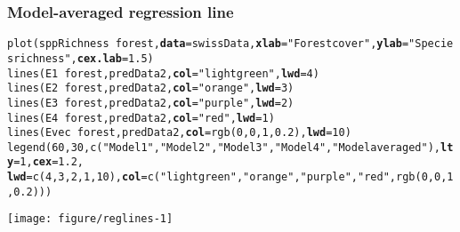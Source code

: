 \documentclass[color=usenames,dvipsnames]{beamer}\usepackage[]{graphicx}\usepackage[]{color}
\makeatletter
\newcommand{\hlnum}[1]{\textcolor[rgb]{0.69,0.494,0}{#1}}%
\newcommand{\hlstr}[1]{\textcolor[rgb]{0.749,0.012,0.012}{#1}}%
\newcommand{\hlopt}[1]{\textcolor[rgb]{0,0,0}{#1}}%
\newcommand{\hlstd}[1]{\textcolor[rgb]{0,0,0}{#1}}%
\newcommand{\hlkwc}[1]{\textcolor[rgb]{0,0,0}{\textbf{#1}}}%
\newcommand{\hlkwd}[1]{\textcolor[rgb]{0.004,0.004,0.506}{#1}}%
\newenvironment{kframe}{%
 \def\at@end@of@kframe{}%
 \ifinner\ifhmode%
  \def\at@end@of@kframe{\end{minipage}}%
  \begin{minipage}{\columnwidth}%
 \fi\fi%
 \def\FrameCommand##1{\hskip\@totalleftmargin \hskip-\fboxsep
 \colorbox{shadecolor}{##1}\hskip-\fboxsep
     \hskip-\linewidth \hskip-\@totalleftmargin \hskip\columnwidth}%
 \MakeFramed {\advance\hsize-\width
   \@totalleftmargin\z@ \linewidth\hsize
   \@setminipage}}%
 {\par\unskip\endMakeFramed%
 \at@end@of@kframe}
\newenvironment{knitrout}{}{} %
\makeatother
\begin{document}
\begin{frame}[fragile]
  \frametitle{Model-averaged regression line}
\begin{knitrout}\tiny
{}\color{fgcolor}\begin{kframe}
\begin{alltt}
\hlkwd{plot}\hlstd{(sppRichness}\hlopt{~}\hlstd{forest,} \hlkwc{data}\hlstd{=swissData,} \hlkwc{xlab}\hlstd{=}\hlstr{"Forest cover"}\hlstd{,} \hlkwc{ylab}\hlstd{=}\hlstr{"Species richness"}\hlstd{,} \hlkwc{cex.lab}\hlstd{=}\hlnum{1.5}\hlstd{)}
\hlkwd{lines}\hlstd{(E1} \hlopt{~} \hlstd{forest, predData2,} \hlkwc{col}\hlstd{=}\hlstr{"lightgreen"}\hlstd{,} \hlkwc{lwd}\hlstd{=}\hlnum{4}\hlstd{)}
\hlkwd{lines}\hlstd{(E2} \hlopt{~} \hlstd{forest, predData2,} \hlkwc{col}\hlstd{=}\hlstr{"orange"}\hlstd{,} \hlkwc{lwd}\hlstd{=}\hlnum{3}\hlstd{)}
\hlkwd{lines}\hlstd{(E3} \hlopt{~} \hlstd{forest, predData2,} \hlkwc{col}\hlstd{=}\hlstr{"purple"}\hlstd{,} \hlkwc{lwd}\hlstd{=}\hlnum{2}\hlstd{)}
\hlkwd{lines}\hlstd{(E4} \hlopt{~} \hlstd{forest, predData2,} \hlkwc{col}\hlstd{=}\hlstr{"red"}\hlstd{,} \hlkwc{lwd}\hlstd{=}\hlnum{1}\hlstd{)}
\hlkwd{lines}\hlstd{(Evec} \hlopt{~} \hlstd{forest, predData2,} \hlkwc{col}\hlstd{=}\hlkwd{rgb}\hlstd{(}\hlnum{0}\hlstd{,}\hlnum{0}\hlstd{,}\hlnum{1}\hlstd{,}\hlnum{0.2}\hlstd{),} \hlkwc{lwd}\hlstd{=}\hlnum{10}\hlstd{)}
\hlkwd{legend}\hlstd{(}\hlnum{60}\hlstd{,} \hlnum{30}\hlstd{,} \hlkwd{c}\hlstd{(}\hlstr{"Model 1"}\hlstd{,}\hlstr{"Model 2"}\hlstd{,}\hlstr{"Model 3"}\hlstd{,}\hlstr{"Model 4"}\hlstd{,}\hlstr{"Model averaged"}\hlstd{),} \hlkwc{lty}\hlstd{=}\hlnum{1}\hlstd{,} \hlkwc{cex}\hlstd{=}\hlnum{1.2}\hlstd{,}
       \hlkwc{lwd}\hlstd{=}\hlkwd{c}\hlstd{(}\hlnum{4}\hlstd{,}\hlnum{3}\hlstd{,}\hlnum{2}\hlstd{,}\hlnum{1}\hlstd{,}\hlnum{10}\hlstd{),} \hlkwc{col}\hlstd{=}\hlkwd{c}\hlstd{(}\hlstr{"lightgreen"}\hlstd{,} \hlstr{"orange"}\hlstd{,} \hlstr{"purple"}\hlstd{,} \hlstr{"red"}\hlstd{,} \hlkwd{rgb}\hlstd{(}\hlnum{0}\hlstd{,}\hlnum{0}\hlstd{,}\hlnum{1}\hlstd{,}\hlnum{0.2}\hlstd{)))}
\end{alltt}
\end{kframe}
\end{knitrout}
\centering
  \texttt{[image: figure/reglines-1]} \\
\end{frame}
\end{document}
